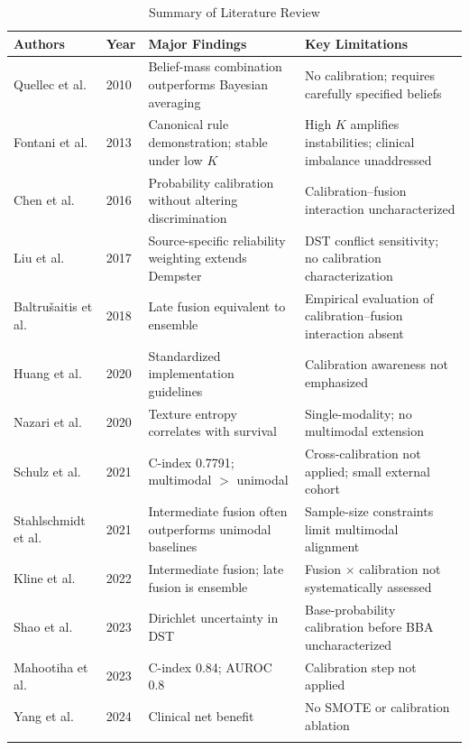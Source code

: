\begin{table}[t]
\centering
\caption{Summary of Literature Review}
\label{tab:lit_summary}
\small
\renewcommand{\arraystretch}{1.2}
\begin{tabularx}{\textwidth}{@{} p{} p{} L L @{}}
\toprule
\textbf{Authors} & \textbf{Year} & \textbf{Major Findings} & \textbf{Key Limitations} \\
\midrule
Quellec et al. & 2010 & Belief-mass combination outperforms Bayesian averaging & No calibration; requires carefully specified beliefs \\ \addlinespace
Fontani et al. & 2013 & Canonical rule demonstration; stable under low $K$ & High $K$ amplifies instabilities; clinical imbalance unaddressed \\ \addlinespace
Chen et al. & 2016 & Probability calibration without altering discrimination & Calibration--fusion interaction uncharacterized \\ \addlinespace
Liu et al. & 2017 & Source-specific reliability weighting extends Dempster & DST conflict sensitivity; no calibration characterization \\ \addlinespace
Baltru{\v{s}}aitis et al. & 2018 & Late fusion equivalent to ensemble & Empirical evaluation of calibration--fusion interaction absent \\ \addlinespace
Huang et al. & 2020 & Standardized implementation guidelines & Calibration awareness not emphasized \\ \addlinespace
Nazari et al. & 2020 & Texture entropy correlates with survival & Single-modality; no multimodal extension \\ \addlinespace
Schulz et al. & 2021 & C-index 0.7791; multimodal $>$ unimodal & Cross-calibration not applied; small external cohort \\ \addlinespace
Stahlschmidt et al. & 2021 & Intermediate fusion often outperforms unimodal baselines & Sample-size constraints limit multimodal alignment \\ \addlinespace
Kline et al. & 2022 & Intermediate fusion; late fusion is ensemble & Fusion $\times$ calibration not systematically assessed \\ \addlinespace
Shao et al. & 2023 & Dirichlet uncertainty in DST & Base-probability calibration before BBA uncharacterized \\ \addlinespace
Mahootiha et al. & 2023 & C-index 0.84; AUROC 0.8 & Calibration step not applied \\ \addlinespace
Yang et al. & 2024 & Clinical net benefit & No SMOTE or calibration ablation \\ \addlinespace

\end{tabularx}
\end{table}
